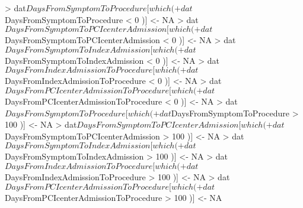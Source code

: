 \documentclass[a4paper]{report}
\begin{document}
\begin{Schunk}
\begin{Sinput}
> dat$DaysFromSymptomToProcedure[ which(
+     dat$DaysFromSymptomToProcedure < 0 )] <- NA
> dat$DaysFromSymptomToPCIcenterAdmission[ which(
+     dat$DaysFromSymptomToPCIcenterAdmission < 0 )] <- NA
> dat$DaysFromSymptomToIndexAdmission[ which(
+     dat$DaysFromSymptomToIndexAdmission < 0 )] <- NA
> dat$DaysFromIndexAdmissionToProcedure[ which(
+     dat$DaysFromIndexAdmissionToProcedure < 0 )] <- NA
> dat$DaysFromPCIcenterAdmissionToProcedure[ which(
+     dat$DaysFromPCIcenterAdmissionToProcedure < 0 )] <- NA
> dat$DaysFromSymptomToProcedure[ which(
+     dat$DaysFromSymptomToProcedure > 100 )] <- NA
> dat$DaysFromSymptomToPCIcenterAdmission[ which(
+     dat$DaysFromSymptomToPCIcenterAdmission > 100 )] <- NA
> dat$DaysFromSymptomToIndexAdmission[ which(
+     dat$DaysFromSymptomToIndexAdmission > 100 )] <- NA
> dat$DaysFromIndexAdmissionToProcedure[ which(
+     dat$DaysFromIndexAdmissionToProcedure > 100 )] <- NA
> dat$DaysFromPCIcenterAdmissionToProcedure[ which(
+     dat$DaysFromPCIcenterAdmissionToProcedure > 100 )] <- NA
\end{Sinput}
\end{Schunk}
\end{document}
